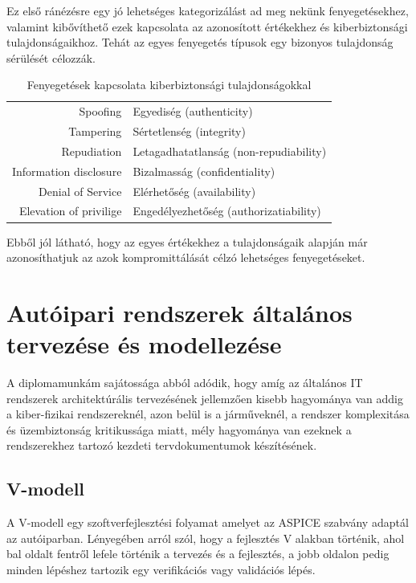 Ez első ránézésre egy jó lehetséges kategorizálást ad meg nekünk fenyegetésekhez, valamint kibővíthető ezek kapcsolata az azonosított értékekhez és kiberbiztonsági tulajdonságaikhoz. Tehát az egyes fenyegetés típusok egy bizonyos tulajdonság sérülését célozzák.

\begin{table}[h]
    \centering
    \begin{tabular}{rl}
        Spoofing & Egyediség (authenticity) \\
        Tampering & Sértetlenség (integrity) \\
        Repudiation & Letagadhatatlanság (non-repudiability) \\
        Information disclosure & Bizalmasság (confidentiality) \\
        Denial of Service & Elérhetőség (availability) \\
        Elevation of privilige & Engedélyezhetőség (authorizatiability) \\
    \end{tabular}
    \caption{Fenyegetések kapcsolata kiberbiztonsági tulajdonságokkal}
    \label{tab:my_label}
\end{table}

Ebből jól látható, hogy az egyes értékekhez a tulajdonságaik alapján már azonosíthatjuk az azok kompromittálását célzó lehetséges fenyegetéseket.

\section{Autóipari rendszerek általános tervezése és modellezése}

A diplomamunkám sajátossága abból adódik, hogy amíg az általános IT rendszerek architektúrális tervezésének jellemzően kisebb hagyománya van addig a kiber-fizikai rendszereknél, azon belül is a járműveknél, a rendszer komplexitása és üzembiztonság kritikussága miatt, mély hagyománya van ezeknek a rendszerekhez tartozó kezdeti tervdokumentumok készítésének.

\subsection{V-modell}

A V-modell egy szoftverfejlesztési folyamat amelyet az ASPICE szabvány adaptál az autóiparban. Lényegében arról szól, hogy a fejlesztés V alakban történik, ahol bal oldalt fentről lefele történik a tervezés és a fejlesztés, a jobb oldalon pedig minden lépéshez tartozik egy verifikációs vagy validációs lépés.

